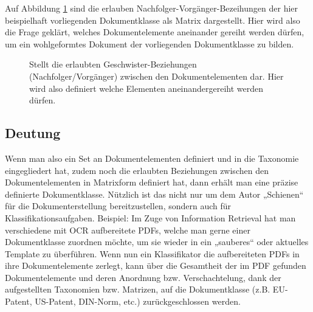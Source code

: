  
Auf Abbildung \ref{matrixgeschwister} sind die erlauben Nachfolger-Vorgänger-Bezeihungen der hier beispielhaft vorliegenden Dokumentklasse als Matrix dargestellt. Hier wird also die Frage geklärt, welches Dokumentelemente aneinander gereiht werden dürfen, um ein wohlgeformtes Dokument der vorliegenden Dokumentklasse zu bilden.

 
\begin{figure}[h!]
\centering
\advance\leftskip-2.5cm
\caption{ Stellt die erlaubten Geschwister-Beziehungen (Nachfolger/Vorgänger) zwischen den Dokumentelementen dar. Hier wird also definiert welche Elementen aneinandergereiht werden dürfen. }\label{matrixgeschwister}
\end{figure}
 
\subsection{Deutung}\label{}
 
Wenn man also ein Set an Dokumentelementen definiert und in die Taxonomie eingegliedert hat, zudem noch die erlaubten Beziehungen zwischen den Dokumentelementen in Matrixform definiert hat, dann erhält man eine präzise definierte Dokumentklasse. Nützlich ist das nicht nur um dem Autor „Schienen“ für die Dokumenterstellung bereitzustellen, sondern auch für Klassifikationsaufgaben. Beispiel: Im Zuge von Information Retrieval hat man verschiedene mit OCR aufbereitete PDFs, welche man gerne einer Dokumentklasse zuordnen möchte, um sie wieder in ein „sauberes“ oder aktuelles Template zu überführen. Wenn nun ein Klassifikator die aufbereiteten PDFs in ihre Dokumentelemente zerlegt, kann über die Gesamtheit der im PDF gefunden Dokumentelemente und deren Anordnung bzw. Verschachtelung, dank der aufgestellten Taxonomien bzw. Matrizen, auf die Dokumentklasse (z.B. EU-Patent, US-Patent, DIN-Norm, etc.) zurückgeschlossen werden.

